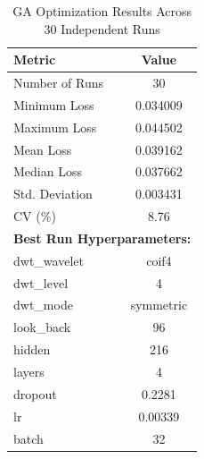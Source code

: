 \begin{table}[htbp]
\centering
\caption{GA Optimization Results Across 30 Independent Runs}
\label{tab:ga_results}
\begin{tabular}{lc}
\hline
\textbf{Metric} & \textbf{Value} \\
\hline
Number of Runs & 30 \\
Minimum Loss   & 0.034009 \\
Maximum Loss   & 0.044502 \\
Mean Loss      & 0.039162 \\
Median Loss    & 0.037662 \\
Std. Deviation & 0.003431 \\
CV (\%)       & 8.76 \\
\hline
\multicolumn{2}{l}{\textbf{Best Run Hyperparameters:}} \\
dwt\_wavelet   & coif4 \\
dwt\_level     & 4 \\
dwt\_mode      & symmetric \\
look\_back     & 96 \\
hidden         & 216 \\
layers         & 4 \\
dropout        & 0.2281 \\
lr             & 0.00339 \\
batch          & 32 \\
\hline
\end{tabular}
\end{table}
